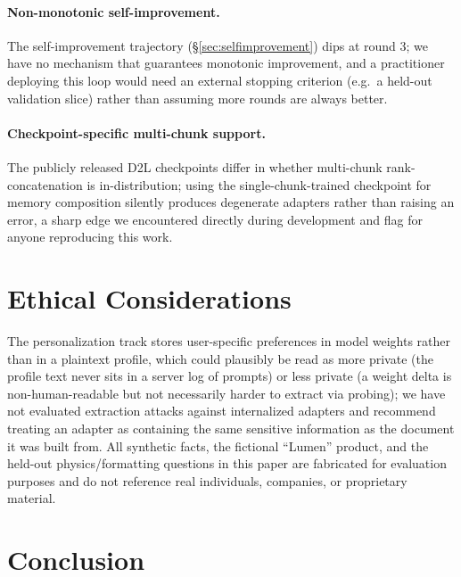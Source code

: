 \documentclass[11pt]{article}
\newcommand{\DTL}{D2L}
\begin{document}
\paragraph{Non-monotonic self-improvement.} The self-improvement trajectory (\S\ref{sec:selfimprovement}) dips at round 3; we have no mechanism that guarantees monotonic improvement, and a practitioner deploying this loop would need an external stopping criterion (e.g.\ a held-out validation slice) rather than assuming more rounds are always better.

\paragraph{Checkpoint-specific multi-chunk support.} The publicly released \DTL{} checkpoints differ in whether multi-chunk rank-concatenation is in-distribution; using the single-chunk-trained checkpoint for memory composition silently produces degenerate adapters rather than raising an error, a sharp edge we encountered directly during development and flag for anyone reproducing this work.

\section*{Ethical Considerations}
The personalization track stores user-specific preferences in model weights rather than in a plaintext profile, which could plausibly be read as more private (the profile text never sits in a server log of prompts) or less private (a weight delta is non-human-readable but not necessarily harder to extract via probing); we have not evaluated extraction attacks against internalized adapters and recommend treating an adapter as containing the same sensitive information as the document it was built from. All synthetic facts, the fictional ``Lumen'' product, and the held-out physics/formatting questions in this paper are fabricated for evaluation purposes and do not reference real individuals, companies, or proprietary material.

\section{Conclusion}
\end{document}
